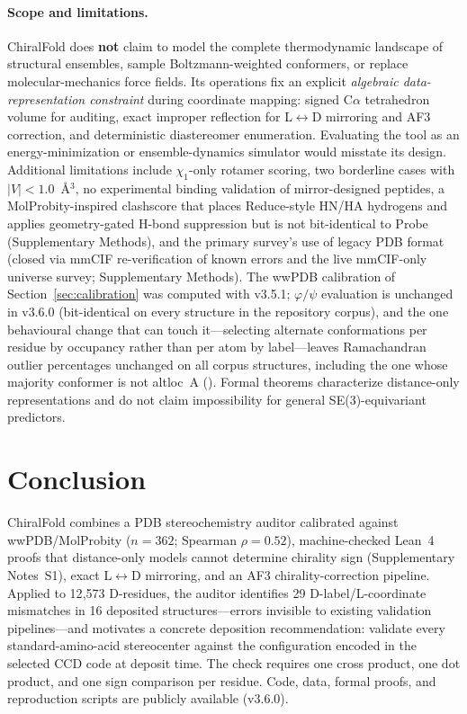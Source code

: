 \documentclass[numsec,webpdf,modern,large,namedate]{oup-authoring-template}
\DeclareRobustCommand{\repopath}[1]{\path{#1}}
\begin{document}
\paragraph{Scope and limitations.}
ChiralFold does \textbf{not} claim to model the complete thermodynamic landscape of structural ensembles, sample Boltzmann-weighted conformers, or replace molecular-mechanics force fields.
Its operations fix an explicit \emph{algebraic data-representation constraint} during coordinate mapping: signed C$\alpha$ tetrahedron volume for auditing, exact improper reflection for L$\leftrightarrow$D mirroring and AF3 correction, and deterministic diastereomer enumeration.
Evaluating the tool as an energy-minimization or ensemble-dynamics simulator would misstate its design.
Additional limitations include $\chi_1$-only rotamer scoring, two borderline cases with $|V|<1.0$~\AA$^3$, no experimental binding validation of mirror-designed peptides, a MolProbity-inspired clashscore that places Reduce-style HN/HA hydrogens and applies geometry-gated H-bond suppression but is not bit-identical to Probe (Supplementary Methods), and the primary survey's use of legacy PDB format (closed via mmCIF re-verification of known errors and the live mmCIF-only universe survey; Supplementary Methods). The wwPDB calibration of Section~\ref{sec:calibration} was computed with v3.5.1; $\varphi/\psi$ evaluation is unchanged in v3.6.0 (bit-identical on every structure in the repository corpus), and the one behavioural change that can touch it---selecting alternate conformations per residue by occupancy rather than per atom by label---leaves Ramachandran outlier percentages unchanged on all corpus structures, including the one whose majority conformer is not altloc~A (\repopath{results/altloc_policy_sensitivity.json}).
Formal theorems characterize distance-only representations and do not claim impossibility for general SE(3)-equivariant predictors.

\section{Conclusion}

ChiralFold combines a PDB stereochemistry auditor calibrated against wwPDB/MolProbity ($n=362$; Spearman $\rho=0.52$), machine-checked Lean~4 proofs that distance-only models cannot determine chirality sign (Supplementary Notes~S1), exact L$\leftrightarrow$D mirroring, and an AF3 chirality-correction pipeline. Applied to 12{,}573 D-residues, the auditor identifies 29 D-label/L-coordinate mismatches in 16 deposited structures---errors invisible to existing validation pipelines---and motivates a concrete deposition recommendation: validate every standard-amino-acid stereocenter against the configuration encoded in the selected CCD code at deposit time. The check requires one cross product, one dot product, and one sign comparison per residue. Code, data, formal proofs, and reproduction scripts are publicly available (v3.6.0).
\end{document}
